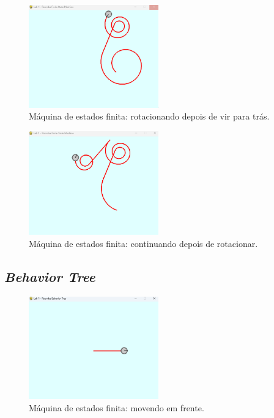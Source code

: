 \documentclass[brazil, 12pt]{article}
\begin{document}
\begin{figure}[H]
	\centering
	\includegraphics[width=0.5\textwidth]{FSM_back_rotate} %
	\caption{Máquina de estados finita: rotacionando depois de vir para trás.} %
	\label{fig:FSM_back_rotate}  %
\end{figure}

\begin{figure}[H]
	\centering
	\includegraphics[width=0.5\textwidth]{FSM_continue} %
	\caption{Máquina de estados finita: continuando depois de rotacionar.} %
	\label{fig:FSM_continue}  %
\end{figure}

\subsection{\textit{Behavior Tree}}
\begin{figure}[H]
	\centering
	\includegraphics[width=0.5\textwidth]{BT_forward} %
	\caption{Máquina de estados finita: movendo em frente.} %
	\label{fig:BT_forward}  %
\end{figure}
\end{document}
